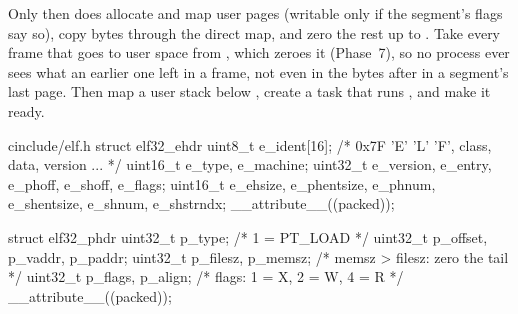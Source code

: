 \documentclass[11pt,a4paper]{article}
\begin{document}
Only then does  allocate and map user pages (writable only if the segment's flags say so), copy
 bytes through the direct map, and zero the rest up to . Take every frame that goes to
user space from , which zeroes it (Phase~7), so no process ever sees what an earlier one left in
a frame, not even in the bytes after  in a segment's last page. Then map a user stack below
, create a task that runs , and make it ready.

\begin{lst}{c}{include/elf.h}
struct elf32_ehdr {
    uint8_t  e_ident[16];           /* 0x7F 'E' 'L' 'F', class, data, version ... */
    uint16_t e_type, e_machine;
    uint32_t e_version, e_entry, e_phoff, e_shoff, e_flags;
    uint16_t e_ehsize, e_phentsize, e_phnum, e_shentsize, e_shnum, e_shstrndx;
} __attribute__((packed));

struct elf32_phdr {
    uint32_t p_type;                /* 1 = PT_LOAD                  */
    uint32_t p_offset, p_vaddr, p_paddr;
    uint32_t p_filesz, p_memsz;     /* memsz > filesz: zero the tail */
    uint32_t p_flags, p_align;      /* flags: 1 = X, 2 = W, 4 = R    */
} __attribute__((packed));
\end{lst}
\end{document}
